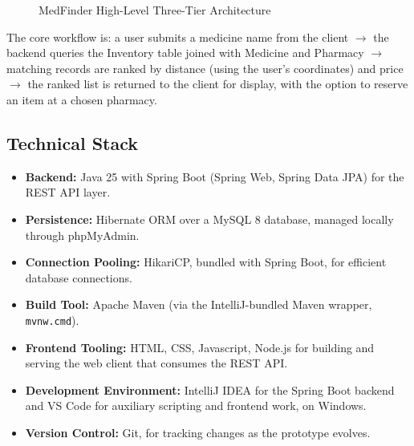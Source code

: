 \documentclass[11pt,a4paper]{report}
\begin{document}
\begin{figure}[h!]
\centering
{}
\caption{MedFinder High-Level Three-Tier Architecture}
\end{figure}

The core workflow is: a user submits a medicine name from the client $\rightarrow$ the backend queries the Inventory table joined with Medicine and Pharmacy $\rightarrow$ matching records are ranked by distance (using the user's coordinates) and price $\rightarrow$ the ranked list is returned to the client for display, with the option to reserve an item at a chosen pharmacy.

\subsection{Technical Stack}

\begin{itemize}
    \item \textbf{Backend:} Java 25 with Spring Boot (Spring Web, Spring Data JPA) for the REST API layer.
    \item \textbf{Persistence:} Hibernate ORM over a MySQL 8 database, managed locally through phpMyAdmin.
    \item \textbf{Connection Pooling:} HikariCP, bundled with Spring Boot, for efficient database connections.
    \item \textbf{Build Tool:} Apache Maven (via the IntelliJ-bundled Maven wrapper, \texttt{mvnw.cmd}).
    \item \textbf{Frontend Tooling:} HTML, CSS, Javascript, Node.js for building and serving the web client that consumes the REST API.
    \item \textbf{Development Environment:} IntelliJ IDEA for the Spring Boot backend and VS Code for auxiliary scripting and frontend work, on Windows.
    \item \textbf{Version Control:} Git, for tracking changes as the prototype evolves.
\end{itemize}
\end{document}
